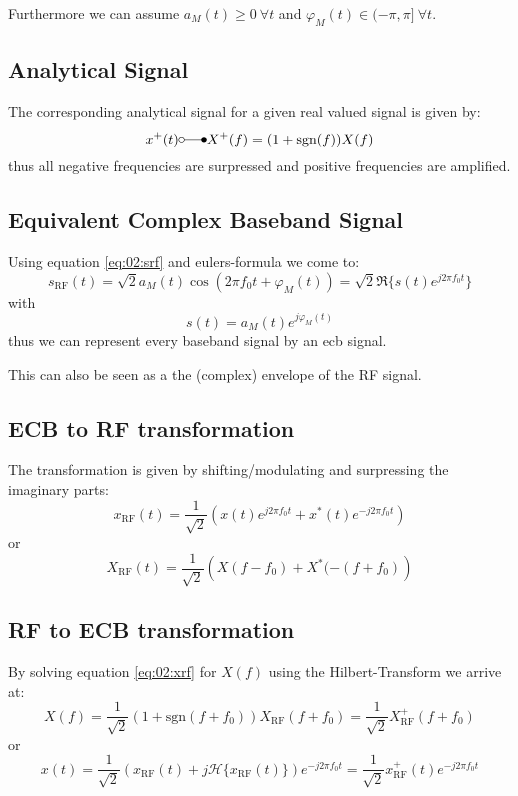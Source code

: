 Furthermore we can assume $a_M(t) \geq 0\ \forall t$ and 
$\varphi_M(t) \in (-\pi, \pi]\ \forall t$.

\subsection{Analytical Signal}
The corresponding analytical signal for a given real valued signal is given by:
\begin{equation}
    x^+(t) \laplace X^+(f) = (1 + \text{sgn}(f)) X(f)
\end{equation}
thus all negative frequencies are surpressed and positive frequencies are amplified.

\subsection{Equivalent Complex Baseband Signal}
Using equation \ref{eq:02:srf} and eulers-formula we come to:
\begin{equation}
    s_\text{RF}(t) = \sqrt{2} a_M(t) \cos(2\pi f_0 t + \varphi_M(t))
        = \sqrt{2} \Re\{s(t) e^{j 2 \pi f_0 t}\}
\end{equation}
with
\begin{equation}
    s(t) = a_M(t) e^{j \varphi_M(t)}
\end{equation}
thus we can represent every baseband signal by an \ac{ecb} signal.

This can also be seen as a the (complex) envelope of the RF signal.

\subsection{ECB to RF transformation}
The transformation is given by shifting/modulating and surpressing the imaginary parts:
\begin{equation} 
    x_\text{RF}(t) = \frac{1}{\sqrt{2}} \left(x(t)e^{j 2 \pi f_0 t} + x^*(t) e^{-j 2 \pi f_0 t}\right)
\end{equation}
or
\begin{equation}\label{eq:02:xrf}
    X_\text{RF}(t) = \frac{1}{\sqrt{2}} \left(X(f-f_0) + X^*(-(f+f_0)\right)
\end{equation}

\subsection{RF to ECB transformation}
By solving equation \ref{eq:02:xrf} for $X(f)$ using the Hilbert-Transform we arrive at:
\begin{equation}
    X(f) = \frac{1}{\sqrt{2}} (1 + \text{sgn}(f + f_0)) X_\text{RF}(f+f_0)
        = \frac{1}{\sqrt{2}} X^+_\text{RF}(f+f_0)
\end{equation}
or
\begin{equation}
    x(t) = \frac{1}{\sqrt{2}} (x_\text{RF}(t) + j\mathcal{H}\{x_\text{RF}(t)\}) 
        e^{-j 2 \pi f_0 t}
    = \frac{1}{\sqrt{2}} x_\text{RF}^+ (t) e^{-j 2 \pi f_0 t}
\end{equation}

